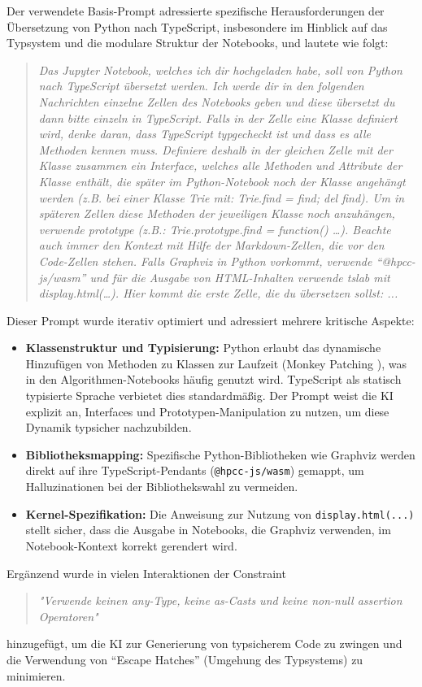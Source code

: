 Der verwendete Basis-Prompt adressierte spezifische Herausforderungen der Übersetzung von Python nach TypeScript, insbesondere im Hinblick auf das Typsystem und die modulare Struktur der Notebooks, und lautete wie folgt:
\begin{quote}
	\textit{Das Jupyter Notebook, welches ich dir hochgeladen habe, soll von Python nach TypeScript übersetzt werden. Ich werde dir in den folgenden Nachrichten einzelne Zellen des Notebooks geben und diese übersetzt du dann bitte einzeln in TypeScript. Falls in der Zelle eine Klasse definiert wird, denke daran, dass TypeScript typgecheckt ist und dass es alle Methoden kennen muss. Definiere deshalb in der gleichen Zelle mit der Klasse zusammen ein Interface, welches alle Methoden und Attribute der Klasse enthält, die später im Python-Notebook noch der Klasse angehängt werden (z.B. bei einer Klasse Trie mit: Trie.find = find; del find). Um in späteren Zellen diese Methoden der jeweiligen Klasse noch anzuhängen, verwende prototype (z.B.: Trie.prototype.find = function() \dots ). Beachte auch immer den Kontext mit Hilfe der Markdown-Zellen, die vor den Code-Zellen stehen. Falls Graphviz in Python vorkommt, verwende \enquote{@hpcc-js/wasm} und für die Ausgabe von HTML-Inhalten verwende tslab mit display.html(\dots). Hier kommt die erste Zelle, die du übersetzen sollst: ...}
\end{quote}

Dieser Prompt wurde iterativ optimiert und adressiert mehrere kritische Aspekte:
\begin{itemize}
	\item \textbf{Klassenstruktur und Typisierung:} Python erlaubt das dynamische Hinzufügen von Methoden zu Klassen zur Laufzeit (Monkey Patching \cite{monkey-patching}), was in den Algorithmen-Notebooks häufig genutzt wird. TypeScript als statisch typisierte Sprache verbietet dies standardmäßig. Der Prompt weist die KI explizit an, Interfaces und Prototypen-Manipulation zu nutzen, um diese Dynamik typsicher nachzubilden.
	\item \textbf{Bibliotheksmapping:} Spezifische Python-Bibliotheken wie Graphviz werden direkt auf ihre TypeScript-Pendants (\texttt{@hpcc-js/wasm}) gemappt, um Halluzinationen bei der Bibliothekswahl zu vermeiden.
	\item \textbf{Kernel-Spezifikation:} Die Anweisung zur Nutzung von \texttt{display.html(...)} stellt sicher, dass die Ausgabe in Notebooks, die Graphviz verwenden, im Notebook-Kontext korrekt gerendert wird.
\end{itemize}
Ergänzend wurde in vielen Interaktionen der Constraint 
\begin{quote}
	\textit{"Verwende keinen any-Type, keine as-Casts und keine non-null assertion Operatoren"}
\end{quote} hinzugefügt, um die KI zur Generierung von typsicherem Code zu zwingen und die Verwendung von \enquote{Escape Hatches} (Umgehung des Typsystems) zu minimieren.

